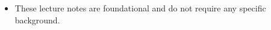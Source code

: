\begin{itemize}
  \item These lecture notes are foundational and do not require any specific background.
\end{itemize}